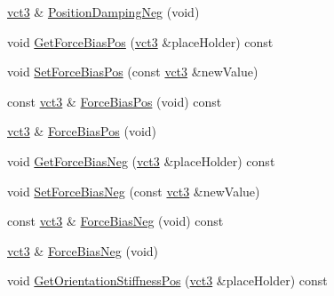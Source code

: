 \begin{DoxyCompactItemize}
\item 
\hyperlink{vct_fixed_size_vector_types_8h_a3af82acdbf4eeb73c551909240b106ea}{vct3} \& \hyperlink{classprm_fixture_gain_cartesian_set_a3a3ebb2a16947f56ad50db0d6af063f3}{Position\+Damping\+Neg} (void)
\item 
void \hyperlink{classprm_fixture_gain_cartesian_set_ab11083c6848ba90b159a739fdfac72b1}{Get\+Force\+Bias\+Pos} (\hyperlink{vct_fixed_size_vector_types_8h_a3af82acdbf4eeb73c551909240b106ea}{vct3} \&place\+Holder) const 
\item 
void \hyperlink{classprm_fixture_gain_cartesian_set_abf7d6bcc6844c481f404c888eb4f5e5f}{Set\+Force\+Bias\+Pos} (const \hyperlink{vct_fixed_size_vector_types_8h_a3af82acdbf4eeb73c551909240b106ea}{vct3} \&new\+Value)
\item 
const \hyperlink{vct_fixed_size_vector_types_8h_a3af82acdbf4eeb73c551909240b106ea}{vct3} \& \hyperlink{classprm_fixture_gain_cartesian_set_a94d1360aa5a1c8d50d68e6a81da03973}{Force\+Bias\+Pos} (void) const 
\item 
\hyperlink{vct_fixed_size_vector_types_8h_a3af82acdbf4eeb73c551909240b106ea}{vct3} \& \hyperlink{classprm_fixture_gain_cartesian_set_aa15cc6eccda107752045b8e9f6a18546}{Force\+Bias\+Pos} (void)
\item 
void \hyperlink{classprm_fixture_gain_cartesian_set_a71c4adab5e13233f949d92e898f4dfc2}{Get\+Force\+Bias\+Neg} (\hyperlink{vct_fixed_size_vector_types_8h_a3af82acdbf4eeb73c551909240b106ea}{vct3} \&place\+Holder) const 
\item 
void \hyperlink{classprm_fixture_gain_cartesian_set_a7325f4463fa04eb9168cf38b420aeb7b}{Set\+Force\+Bias\+Neg} (const \hyperlink{vct_fixed_size_vector_types_8h_a3af82acdbf4eeb73c551909240b106ea}{vct3} \&new\+Value)
\item 
const \hyperlink{vct_fixed_size_vector_types_8h_a3af82acdbf4eeb73c551909240b106ea}{vct3} \& \hyperlink{classprm_fixture_gain_cartesian_set_aff9b220c49351366efc0374f595f5387}{Force\+Bias\+Neg} (void) const 
\item 
\hyperlink{vct_fixed_size_vector_types_8h_a3af82acdbf4eeb73c551909240b106ea}{vct3} \& \hyperlink{classprm_fixture_gain_cartesian_set_a8930b57591501d067f307effdc1cd152}{Force\+Bias\+Neg} (void)
\item 
void \hyperlink{classprm_fixture_gain_cartesian_set_ad860237303f50647631cea53fc339001}{Get\+Orientation\+Stiffness\+Pos} (\hyperlink{vct_fixed_size_vector_types_8h_a3af82acdbf4eeb73c551909240b106ea}{vct3} \&place\+Holder) const 
\item 

\end{DoxyCompactItemize}

